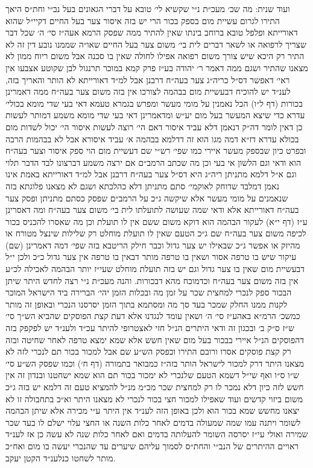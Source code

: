 \documentclass[12pt, openany]{book}
\begin{document}
\begin{multicols}{2}
ועוד שנית: מה שכ׳ מעכ״ת נ״י שקשיא לי׳ טובא על דברי הגאונים בעל נב״י וחת״ס היאך התירו לגרום עשיית מום בספק בכור הרי יש בזה איסור צער בעל החיים דקיי״ל שהוא דאורייתא ופלפל טובא ברוחב בינתו שאין להתיר ממה שפסק הרמא אעה״ז סי׳ ה׳ שכל דבר שצריך לרפואה או לשאר דברים לית בי׳ משום צער בעל החיים שאו״ה שממנו נובע דין זה לא התיר רק היכא שיש צורך משום רפואה אפילו לחולה שאין בו סכנה אבל משום ריוח ממון לא מצאנו שהתיר ושגם ממה דאמר ר׳ יהודה בע״ז פרק קמא במוכר תרנגול לבן שקוטע אצבעו אין ראי׳ דאפשר דס״ל כריה״ג צער בעה״ח דרבנן אבל למ״ד דאורייתא לא הותר והאריך בזה, לענ״ד יש להוכיח דבעשיית מום בבהמה לצורכו אין בזה משום צער בעה״ח ממה דאמרינן בכורות (דף ל״ו) הכל נאמנין על מומי מעשר ומפרש בגמרא טעמא דאי בעי שדי מומא בכולי׳ עדרא כדי שיצא המעשר בעל מום יע״ש ומדאמרינן דאי בעי שדי מומא משמע דמותר לעשות כן דאין לומר דה״ק דנאמן דלא עביד איסור דאם הי׳ רוצה לעשות איסור הי׳ יכול לשדות מום בכולא עדרא דז״א דמה מגו הוא זה דדלמא בבהמה א׳ עביד איסורא אבל לא בבהמות הרבה ובפרט כיון שבספק מעשר איירי כמו שפי׳ רש״י שם דעשיית מום הוי ספק איסור וצער בעה״ח הוא ודאי וגם הלשון אי בעי וכן מה שכתב הרמב״ם אם ירצה משמע דברצונו לבד הדבר תלוי וגם א״ל דלמא מתניתן ריה״ג היא דס״ל צער בעה״ח דרבנן אבל למ״ד דאורייתא באמת אינו נאמן דמלבד שדוחק לאוקמי׳ סתם מתניתן דלא כהלכתא ושגם לא מצאנו פלוגתא בזה שנאמנים על מומי מעשר אלא שיקשה ג״כ על הרמב״ם שפסק כסתם מתניתן ופסק צער בעה״ח דאורייתא אלא ודאי שמה שעושה לתועלתו לית בי׳ משום צער בעה״ח ומה דאסרינן ע״ז (דף י״א) לעקור הבהמה הוא דוקא משום ששם אין לו תועלת וכן מה שאסרו להכניס בכור לכיפה משום צער בעה״ח שם ג״כ הטעם שאין לו תועלת מוחלט רק שלילות שינצל מטורח או מהיזק או אפשר ג״כ שבאילו יש צער גדול וכבר חילק הריטבא בזה שפי׳ דמה דאמרינן (שם) עיקור שיש בו טרפה אסור ושאין בו טרפה מותר דבאין בו טרפה אין צער גדול כ״כ ולכן י״ל דבעשיית מום שאין בו צער גדול וגם יש בזה תועלת מוחלט שעי״ז יותר הבהמה לאכילה לכ״ע אין בזה משום צער בעה״ח וכדמוכח מהא דבכורות. והנה מעכ״ת נ״י רצה לחדש היתר שיתן הבכור ספק לנכרי למחצית שכר על זמן מה ובכלות הזמן יהי׳ הברירה ביד הישראל המוכר לקנות ממנו החלק שמכר בעד סך מה ומסתמא בתוך הזמן יסרסנו הנכרי ובאופן זה מותר כמשכ׳ הרמ״א באהע״ז סי׳ ה׳ ושאין עומד לנגדנו אלא דעת קצת הפוסקים שהביא הש״ך סי׳ ש״ז ס״ק ב׳ ובכגון זה ודאי היתרים הנ״ל חזי לאצטרופי להיתר עכ״ד ולענ״ד יש לפקפק בזה דהפוסקים הנ״ל איירי בבכור בעל מום שאין חשש אלא שמא ימצא טרפה לאחר שחיטה ובזה רק קצת פוסקים אסרו ורובם התירו וכפסק הש״ע שם אבל למכור בכור תם לנכרי לזה לא מצאנו היתר דרק למכור לישראל הותר בזה״ז כמבואר בתמורה (דף ח׳) וכמו שפסק הש״ע סי׳ ש״ו ס״ו ואף שי״ל דשמא הטעם שלנכרי לא ימכור בכור תם הוא שמא ישחטנו ובנדון זה אין חשש לזה כיון דלא נמכר לו רק למחצית שכר מכ״מ מנ״ל להמציא טעם זה דלמא יש בזה ג״כ משום ביזוי קדשים ועוד שאפילו למכור חצי בכור לנכרי לא מצאנו היתר וא״כ בתחבולה זו לא יצאנו מחשש שמא בכור הוא ולכן באופן הזה לענ״ד אין היתר ע״י מכירה אלא שיתן הבהמה לשומר ויתנה עמו שמה שמעולה בדמים לאחר כלות השנה או החצי עלוי ישלם לו בעד שכר שמירה ואולי עי״ז יסרסה השומר להעלותה בדמים ואם לאחר כלות שנה לא עשה כן אז לענ״ד ראויים ההיתרים של הנב״י והחת״ס לסמוך עליהם שיערים עד שהנכרי יעשה בו מום ואח״כ מותר לשחטו כנלענ״ד הקטן יעקב.\\\vspace{0pt}

\end{multicols}\newpage
\end{document}
